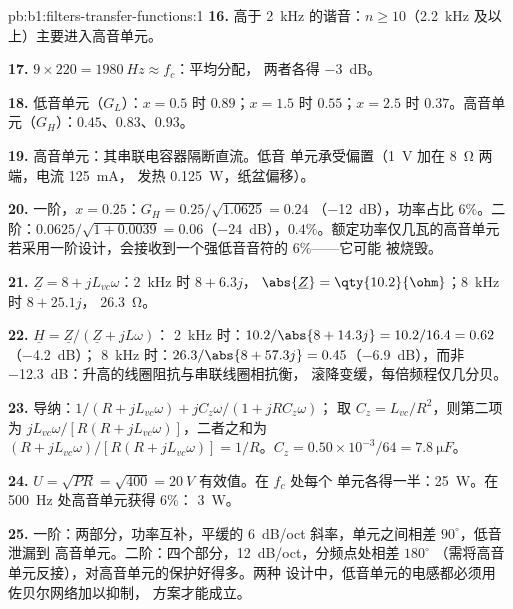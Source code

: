 \begin{solution}{pb:b1:filters-transfer-functions:1}
\textbf{16.} 高于 \qty{2}{kHz} 的谐音：$n \geq 10$（\qty{2.2}{kHz}
及以上）主要进入高音单元。

\textbf{17.} $9 \times 220 = \qty{1980}{Hz} \approx f_c$：平均分配，
两者各得 \qty{-3}{dB}。

\textbf{18.} 低音单元（$G_L$）：$x = 0.5$ 时 $0.89$；$x = 1.5$ 时 $0.55$；$x = 2.5$ 时
$0.37$。高音单元（$G_H$）：$0.45$、$0.83$、$0.93$。

\textbf{19.} 高音单元：其串联电容器隔断直流。低音
单元承受偏置（\qty{1}{V} 加在 \qty{8}{\ohm} 两端，电流 \qty{125}{mA}，
发热 \qty{0.125}{W}，纸盆偏移）。

\textbf{20.} 一阶，$x = 0.25$：$G_H = 0.25/\sqrt{1.0625} = 0.24$
（\qty{-12}{dB}），功率占比 $6\%$。二阶：$0.0625/\sqrt{1 +
0.0039} = 0.06$（\qty{-24}{dB}），$0.4\%$。额定功率仅几瓦的高音单元
若采用一阶设计，会接收到一个强低音音符的 $6\%$——它可能
被烧毁。

\textbf{21.} $\underline Z = 8 + jL_{vc}\omega$：\qty{2}{kHz} 时 $8 + 6.3j$，
$\abs{\underline Z} = \qty{10.2}{\ohm}$；\qty{8}{kHz} 时 $8 + 25.1j$，
\qty{26.3}{\ohm}。

\textbf{22.} $\underline H = \underline Z/(\underline Z + jL\omega)$：
\qty{2}{kHz} 时：$10.2/\abs{8 + 14.3j} = 10.2/16.4 = 0.62$（\qty{-4.2}{dB}）；
\qty{8}{kHz} 时：$26.3/\abs{8 + 57.3j} = 0.45$（\qty{-6.9}{dB}），而非
\qty{-12.3}{dB}：升高的线圈阻抗与串联线圈相抗衡，
滚降变缓，每倍频程仅几分贝。

\textbf{23.} 导纳：$1/(R + jL_{vc}\omega) + jC_z\omega/(1 + jRC_z\omega)$；
取 $C_z = L_{vc}/R^2$，则第二项为 $jL_{vc}\omega/[R(R +
jL_{vc}\omega)]$，二者之和为 $(R + jL_{vc}\omega)/[R(R + jL_{vc}\omega)]
= 1/R$。$C_z = 0.50\times10^{-3}/64 = \qty{7.8}{\micro F}$。

\textbf{24.} $U = \sqrt{PR} = \sqrt{400} = \qty{20}{V}$ 有效值。在 $f_c$ 处每个
单元各得一半：\qty{25}{W}。在 \qty{500}{Hz} 处高音单元获得 $6\%$：
\qty{3}{W}。

\textbf{25.} 一阶：两部分，功率互补，平缓的
\qty{6}{dB/oct} 斜率，单元之间相差 $90^\circ$，低音泄漏到
高音单元。二阶：四个部分，\qty{12}{dB/oct}，分频点处相差 $180^\circ$
（需将高音单元反接），对高音单元的保护好得多。两种
设计中，低音单元的电感都必须用 佐贝尔网络加以抑制，
方案才能成立。
\end{solution}
